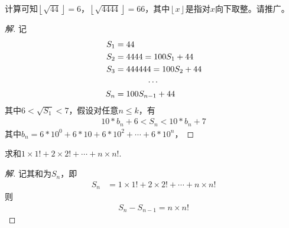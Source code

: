 \begin{example}
  计算可知$\left\lfloor\sqrt{44}\right\rfloor=6$，$\left\lfloor\sqrt{4444}\right\rfloor=66$，其中$\left\lfloor x\right\rfloor$是指对$x$向下取整。请推广。
\end{example}
\begin{proof}[解]
  记
  \begin{align*}
    S_1&=44\\
    S_2&=4444=100S_1+44\\
    S_3&=444444=100S_2+44\\
    \multicolumn{2}{c}{$\cdots$}\\
    S_n&=100S_{n-1}+44
  \end{align*}
  其中$6<\sqrt{S_1}<7$，假设对任意$n\le k$，有
  \begin{align*}
    10*b_n+6<S_n<10*b_n+7
  \end{align*}
  其中$b_n=6*10^0+6*10+6*10^2+\cdots+6*10^n$，
\end{proof}

\begin{example}
  求和$1\times 1!+2\times 2! + \cdots + n\times n!.$
\end{example}
\begin{proof}[解]
  记其和为$S_n$，即
  \begin{align*}
    S_n&=1\times 1!+2\times 2! + \cdots + n\times n!
  \end{align*}
  则
  \begin{align*}
    S_n - S_{n-1} = n\times n!
  \end{align*}

\end{proof}
